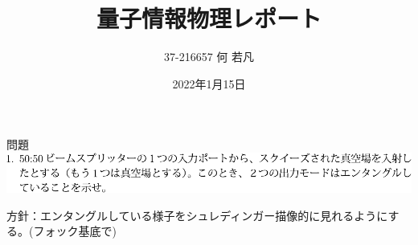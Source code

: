 \documentclass{jsarticle}
\begin{document}
\title{量子情報物理レポート}
\author{37-216657 何 若凡}
\date{2022年1月15日}
\maketitle


\begin{itembox}[l]{問題}
	\vspace*{-0mm}
	\centering
	\includegraphics[width=1\linewidth]{./graphics/1.pdf}

方針：エンタングルしている様子をシュレディンガー描像的に見れるようにする。(フォック基底で)
\end{itembox}
\end{document}
